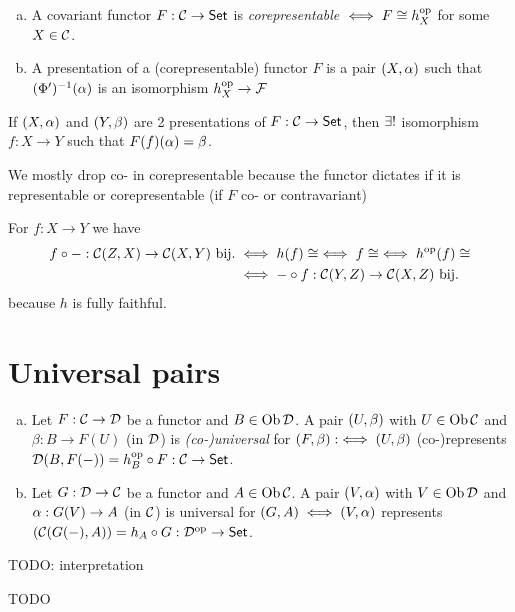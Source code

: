 \documentclass[a4paper]{report}
\begin{document}
\begin{defi}
\begin{enumerate}[(a)]
  \item A covariant functor $F: \mathcal{C} \to \mathsf{Set}$ is \emph{corepresentable} $\iff F \cong h_{X}^\text{op}$ for some $X \in \mathcal{C}$.
        \item A presentation of a (corepresentable) functor $F$ is a pair $(X, \alpha)$ such that $(\Phi')^{-1}(\alpha)$ is an isomorphism $h_{X}^\text{op} \to \mathcal F$
\end{enumerate}
\end{defi}

\begin{prop}[analog of 32] If $(X, \alpha)$ and $(Y, \beta)$ are 2 presentations of $F: \mathcal{C} \to \mathsf{Set}$, then $\exists!$ isomorphism $f: X \to Y$ such that $F(f)(\alpha) = \beta$.
\end{prop}
\begin{rem*}
We mostly drop co- in corepresentable because the functor dictates if it is representable or corepresentable (if $F$ co- or contravariant)
\end{rem*}
\begin{rem*}
  For $f: X \to Y$ we have
  \begin{align*}
    f \circ -  : \mathcal{C}(Z,X) \to \mathcal{C}(X,Y) \text{ bij.} &\iff h(f) \cong \iff f \cong \iff h^\text{op}(f) \cong \\&\iff -\circ f : \mathcal{C}(Y,Z) \to \mathcal{C}(X,Z) \text{ bij.}
  \end{align*} because $h$ is fully faithful.

\end{rem*}

\section{Universal pairs}
\begin{defi}
\begin{enumerate}[(a)]
  \item Let $F: \mathcal{C} \to \mathcal{D}$ be a functor and $B \in \operatorname{Ob} \mathcal{D}$. A pair $(U, \beta)$ with $U \in \operatorname{Ob} \mathcal{C}$ and $\beta: B \to F(U)$ (in $\mathcal{D}$) is \emph{(co-)universal} for $(F, \beta):\iff (U,\beta)$ (co-)represents $\mathcal{D}(B, F(-)) = h_{B}^\text{op} \circ F: \mathcal{C} \to \mathsf{Set}$.
  \item Let $G: \mathcal{D} \to \mathcal{C}$ be a functor and $A \in \operatorname{Ob} \mathcal{C}$. A pair $(V, \alpha)$ with $V \in \operatorname{Ob} \mathcal{D}$ and $\alpha : G(V) \to A$ (in $\mathcal{C}$) is universal for $(G, A) \iff (V, \alpha)$ represents $(\mathcal{C}(G(-), A)) = h_{A} \circ G: \mathcal{D}^\text{op} \to \mathsf{Set}$.
\end{enumerate}
TODO: interpretation
\end{defi}
\begin{exmps}
\begin{enumerate}[(a)]
TODO
\end{enumerate}

\end{exmps}
\end{document}
